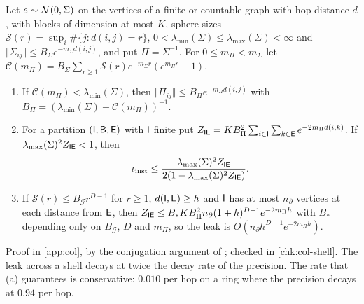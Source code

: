 \begin{theorem}\label{thm:col-thick-shell}
Let $e\sim\mathcal{N}(0,\Sigma)$ on the vertices of a finite or countable graph with hop distance $d$, with blocks of dimension at most $K$, sphere sizes $\mathcal S(r)=\sup_i\#\{j:d(i,j)=r\}$, $0<\lambda_{\min}(\Sigma)\le\lambda_{\max}(\Sigma)<\infty$ and $\Vert\Sigma_{ij}\Vert\le B_\Sigma e^{-m_\Sigma d(i,j)}$, and put $\Pi=\Sigma^{-1}$. For $0\le m_\Pi<m_\Sigma$ let $\mathcal C(m_\Pi)=B_\Sigma\sum_{r\ge1}\mathcal S(r)e^{-m_\Sigma r}(e^{m_\Pi r}-1)$.
\begin{enumerate}
\item[(a)] If $\mathcal C(m_\Pi)<\lambda_{\min}(\Sigma)$, then $\Vert\Pi_{ij}\Vert\le B_\Pi e^{-m_\Pi d(i,j)}$ with $B_\Pi=(\lambda_{\min}(\Sigma)-\mathcal C(m_\Pi))^{-1}$.
\item[(b)] For a partition $(\mathsf{I},\mathsf{B},\mathsf{E})$ with $\mathsf{I}$ finite put $Z_{\mathsf{I}\mathsf{E}}=KB_\Pi^2\sum_{i\in\mathsf{I}}\sum_{k\in\mathsf{E}}e^{-2m_\Pi d(i,k)}$. If $\lambda_{\max}(\Sigma)^2Z_{\mathsf{I}\mathsf{E}}<1$, then
\begin{equation}\label{eq:col-thick-shell}
\iota_{\mathrm{inst}}\le\frac{\lambda_{\max}(\Sigma)^2Z_{\mathsf{I}\mathsf{E}}}{2(1-\lambda_{\max}(\Sigma)^2Z_{\mathsf{I}\mathsf{E}})}.
\end{equation}
\item[(c)] If $\mathcal S(r)\le B_{\mathcal G}r^{D-1}$ for $r\ge1$, $d(\mathsf{I},\mathsf{E})\ge h$ and $\mathsf{I}$ has at most $n_\partial$ vertices at each distance from $\mathsf{E}$, then $Z_{\mathsf{I}\mathsf{E}}\le B_*KB_\Pi^2n_\partial(1+h)^{D-1}e^{-2m_\Pi h}$ with $B_*$ depending only on $B_{\mathcal G}$, $D$ and $m_\Pi$, so the leak is $O(n_\partial h^{D-1}e^{-2m_\Pi h})$.
\end{enumerate}
\end{theorem}
Proof in \cref{app:col}, by the conjugation argument of \citet{combes1973asymptotic}; checked in \cref{chk:col-shell}. The leak across a shell decays at twice the decay rate of the precision. The rate that (a) guarantees is conservative: $0.010$ per hop on a ring where the precision decays at $0.94$ per hop.

